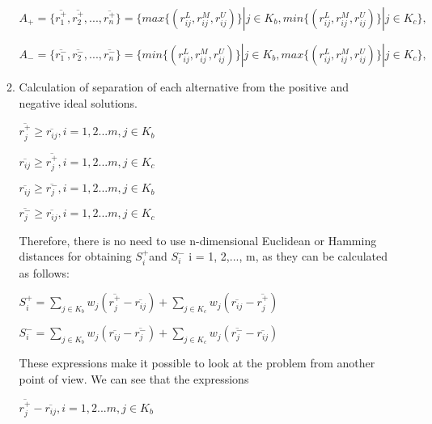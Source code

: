 \documentclass[12pt,a4paper]{article}
\begin{document}
\begin{enumerate}
\begin{enumerate}
\begin{center}

$A_{+}=\{\overline{r^{+}_{1}},\overline{r^{+}_{2}},...,\overline{r^{+}_{n}}\}=\{max\{(r_{ij}^{L},r_{ij}^{M},r_{ij}^{U})\}|j\in K_{b}, min\{(r_{ij}^{L},r_{ij}^{M},r_{ij}^{U})\}|j\in K_{c}\},$


$A_{-}=\{\overline{r^{-}_{1}},\overline{r^{-}_{2}},...,\overline{r^{-}_{n}}\}=\{min\{(r_{ij}^{L},r_{ij}^{M},r_{ij}^{U})\}|j\in K_{b}, max\{(r_{ij}^{L},r_{ij}^{M},r_{ij}^{U})\}|j\in K_{c}\},$
  
\end{center}
\item Calculation of separation of each alternative from the positive and negative ideal solutions.

\begin{center}

$\overline{r_{j}^{+}} \geq \overline{r_{ij}} , i=1,2...m , j \in K_{b}$

$\overline{r_{ij}} \geq \overline{r_{j}^{+}} , i=1,2...m , j \in K_{c}$

$\overline{r_{ij}} \geq \overline{r_{j}^{-}} , i=1,2...m , j \in K_{b}$

$\overline{r_{j}^{-}} \geq \overline{r_{ij}} , i=1,2...m , j \in K_{c}$
    
\end{center}

Therefore, there is no need to use n-dimensional Euclidean or Hamming distances for obtaining $S_{i}^{+}$and $S_{i}^{-}$ i = 1, 2,..., m, as they can be calculated as follows:

\begin{center}  

$S_{i}^{+}=\sum\limits_{j \in K_{b}}w_{j}(\overline{r_{j}^{+}}-\overline{r_{ij}})+\sum\limits_{j \in K_{c}}w_{j}(\overline{r_{ij}}-\overline{r_{j}^{+}})$

$S_{i}^{-}=\sum\limits_{j \in K_{b}}w_{j}(\overline{r_{ij}}-\overline{r_{j}^{-}})+\sum\limits_{j \in K_{c}}w_{j}(\overline{r_{j}^{-}}-\overline{r_{ij}})$

\end{center}

These expressions make it possible to look at the problem from another point of view. We can see that the expressions 

\begin{center}

$\overline{r_{j}^{+}} - \overline{r_{ij}} , i=1,2...m , j \in K_{b}$


\end{center}
\end{enumerate}
\end{enumerate}
\end{document}
